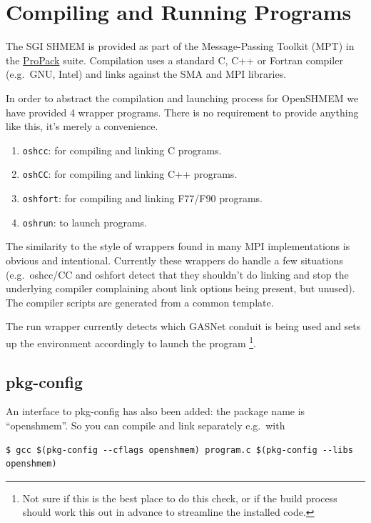 \documentclass[english]{article}
\begin{document}
\section{Compiling and Running Programs}

The SGI SHMEM is provided as part of the Message-Passing Toolkit (MPT)
in the
\href{http://www.sgi.com/products/software/propack.html}{ProPack}
suite. Compilation uses a standard C, C++ or Fortran compiler
(e.g.\ GNU, Intel) and links against the SMA and MPI libraries.

In order to abstract the compilation and launching process for
OpenSHMEM we have provided 4 wrapper programs.  There is no
requirement to provide anything like this, it's merely a convenience.

\begin{enumerate}
\item \texttt{oshcc}: for compiling and linking C programs.
\item \texttt{oshCC}: for compiling and linking C++ programs.
\item \texttt{oshfort}: for compiling and linking F77/F90 programs.
\item \texttt{oshrun}: to launch programs.
\end{enumerate}

The similarity to the style of wrappers found in many MPI
implementations is obvious and intentional. Currently these wrappers
do handle a few situations (e.g.\ oshcc/CC and oshfort detect that they
shouldn't do linking and stop the underlying compiler complaining
about link options being present, but unused). The compiler scripts
are generated from a common template.

The run wrapper currently detects which GASNet conduit is being used
and sets up the environment accordingly to launch the program
\footnote{Not sure if this is the best place to do this check, or if
  the build process should work this out in advance to streamline the
  installed code.}.

\subsection{pkg-config}

An interface to pkg-config has also been added: the package name is
``openshmem''.  So you can compile and link separately e.g.\ with

\begin{lstlisting}
$ gcc $(pkg-config --cflags openshmem) program.c $(pkg-config --libs openshmem)
\end{lstlisting}
\end{document}
